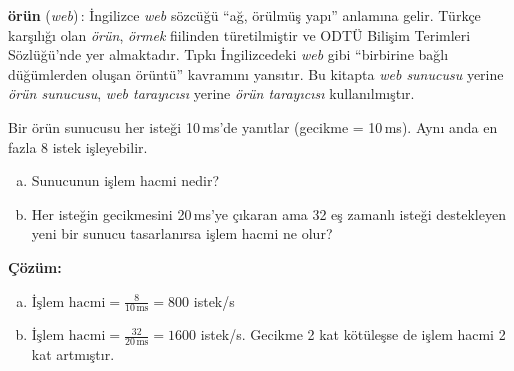 \begin{terimnotu}
\textbf{örün} (\emph{web})\,: İngilizce \emph{web} sözcüğü ``ağ, örülmüş yapı'' anlamına gelir. Türkçe karşılığı olan \emph{örün}, \emph{örmek} fiilinden türetilmiştir ve ODTÜ Bilişim Terimleri Sözlüğü'nde yer almaktadır. Tıpkı İngilizcedeki \emph{web} gibi ``birbirine bağlı düğümlerden oluşan örüntü'' kavramını yansıtır. Bu kitapta \emph{web sunucusu} yerine \emph{örün sunucusu}, \emph{web tarayıcısı} yerine \emph{örün tarayıcısı} kullanılmıştır.
\end{terimnotu}

\begin{ornek}[2.4]
Bir örün sunucusu her isteği 10\,ms'de yanıtlar (gecikme = 10\,ms). Aynı anda en fazla 8 istek işleyebilir.
\begin{enumerate}[(a)]
    \item Sunucunun işlem hacmi nedir?
    \item Her isteğin gecikmesini 20\,ms'ye çıkaran ama 32 eş zamanlı isteği destekleyen yeni bir sunucu tasarlanırsa işlem hacmi ne olur?
\end{enumerate}

\textbf{Çözüm:}
\begin{enumerate}[(a)]
    \item $\text{İşlem hacmi} = \frac{8}{10\,\text{ms}} = 800$ istek/s
    \item $\text{İşlem hacmi} = \frac{32}{20\,\text{ms}} = 1600$ istek/s. Gecikme 2 kat kötüleşse de işlem hacmi 2 kat artmıştır.
\end{enumerate}
\end{ornek}

